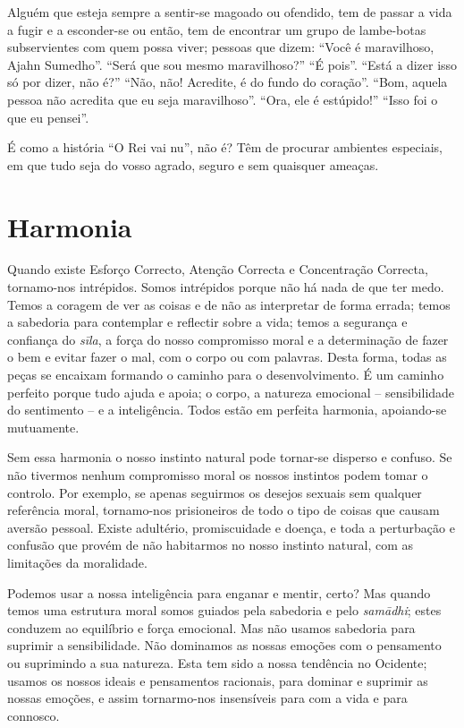 Alguém que esteja sempre a sentir-se magoado ou ofendido, tem de passar a vida a
fugir e a esconder-se ou então, tem de encontrar um grupo de lambe-botas
subservientes com quem possa viver; pessoas que dizem: “Você é maravilhoso,
Ajahn Sumedho”. “Será que sou mesmo maravilhoso?” “É pois”. “Está a dizer isso
só por dizer, não é?” “Não, não! Acredite, é do fundo do coração”. “Bom, aquela
pessoa não acredita que eu seja maravilhoso”. “Ora, ele é estúpido!” “Isso foi o
que eu pensei”.

É como a história “O Rei vai nu”, não é? Têm de procurar ambientes especiais, em
que tudo seja do vosso agrado, seguro e sem quaisquer ameaças.

\section{Harmonia}

Quando existe Esforço Correcto, Atenção Correcta e Concentração Correcta,
tornamo-nos intrépidos. Somos intrépidos porque não há nada de que ter medo.
Temos a coragem de ver as coisas e de não as interpretar de forma errada; temos
a sabedoria para contemplar e reflectir sobre a vida; temos a segurança e
confiança do \emph{sīla}, a força do nosso compromisso moral e a determinação de
fazer o bem e evitar fazer o mal, com o corpo ou com palavras. Desta forma,
todas as peças se encaixam formando o caminho para o desenvolvimento. É um
caminho perfeito porque tudo ajuda e apoia; o corpo, a natureza emocional –
sensibilidade do sentimento – e a inteligência. Todos estão em perfeita
harmonia, apoiando-se mutuamente.

Sem essa harmonia o nosso instinto natural pode tornar-se disperso e confuso. Se
não tivermos nenhum compromisso moral os nossos instintos podem tomar o
controlo. Por exemplo, se apenas seguirmos os desejos sexuais sem qualquer
referência moral, tornamo-nos prisioneiros de todo o tipo de coisas que causam
aversão pessoal. Existe adultério, promiscuidade e doença, e toda a perturbação
e confusão que provém de não habitarmos no nosso instinto natural, com as
limitações da moralidade.

Podemos usar a nossa inteligência para enganar e mentir, certo? Mas quando temos
uma estrutura moral somos guiados pela sabedoria e pelo \emph{samādhi}; estes
conduzem ao equilíbrio e força emocional. Mas não usamos sabedoria para suprimir
a sensibilidade. Não dominamos as nossas emoções com o pensamento ou suprimindo
a sua natureza. Esta tem sido a nossa tendência no Ocidente; usamos os nossos
ideais e pensamentos racionais, para dominar e suprimir as nossas emoções, e
assim tornarmo-nos insensíveis para com a vida e para connosco.

